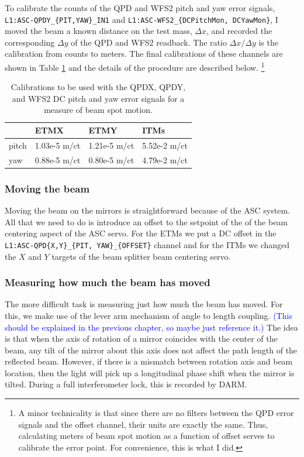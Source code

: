To calibrate the counts of the QPD and WFS2 pitch and yaw error
signals, \texttt{L1:ASC-QPDY\_\{PIT,YAW\}\_IN1} and
\texttt{L1:ASC-WFS2\_\{DCPitchMon, DCYawMon\}}, I moved the beam a
known distance on the test mass, $\Delta x$, and recorded the
corresponding $\Delta y$ of the QPD and WFS2 readback. The ratio
$\Delta x /\Delta y$ is the calibration from counts to meters. The
final calibrations of these channels are shown in Table
\ref{table:bsmcal} and the details of the procedure are described
below. \footnote{A minor technicality is that since there are no
  filters between the QPD error signals and the offset channel, their
  units are exactly the same. Thus, calculating meters of beam spot
  motion as a function of offset serves to calibrate the error
  point. For convenience, this is what I did.}

\begin{table}
\centering
\begin{tabular}{l l l l}
\hline
         & ETMX & ETMY & ITMs \\
\hline
pitch & 1.03e-5 m/ct & 1.21e-5 m/ct & 5.52e-2 m/ct \\
yaw & 0.88e-5 m/ct & 0.80e-5 m/ct & 4.79e-2 m/ct \\
\hline
\end{tabular}
\caption{Calibrations to be used with the QPDX, QPDY, and WFS2 DC
  pitch and yaw error signals for a measure of beam spot motion.}
\label{table:bsmcal}
\end{table}


\subsubsection{Moving the beam} 
Moving the beam on the mirrors is straightforward because of the ASC
system. All that we need to do is introduce an offset to the setpoint
of the of the beam centering aspect of the ASC servo. For the ETMs we
put a DC offset in the \texttt{L1:ASC-QPD\{X,Y\}\_\{PIT,
  YAW\}\_\{OFFSET\}} channel and for the ITMs we changed the $X$ and
$Y$ targets of the beam splitter beam centering servo.

\subsubsection{Measuring how much the beam has moved} 
The more difficult task is measuring just how much the beam has
moved. For this, we make use of the lever arm mechanism of angle to
length coupling. \textcolor{blue}{(This should be explained in the
  previous chapter, so maybe just reference it.)} The idea is that
when the axis of rotation of a mirror coincides with the center of the
beam, any tilt of the mirror about this axis does not affect the path
length of the reflected beam. However, if there is a mismatch between
rotation axis and beam location, then the light will pick up a
longitudinal phase shift when the mirror is tilted. During a full
interferometer lock, this is recorded by DARM.

